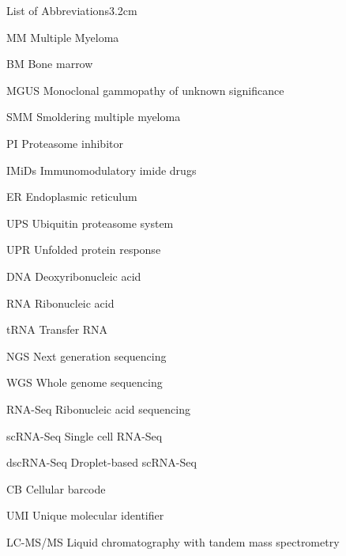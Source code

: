 \begin{mclistof}{List of Abbreviations}{3.2cm}

\item[MM] Multiple Myeloma

\item[BM] Bone marrow

\item[MGUS] Monoclonal gammopathy of unknown significance

\item[SMM] Smoldering multiple myeloma

\item[PI] Proteasome inhibitor

\item[IMiDs] Immunomodulatory imide drugs

\item[ER] Endoplasmic reticulum

\item[UPS] Ubiquitin proteasome system

\item[UPR] Unfolded protein response

\item[DNA] Deoxyribonucleic acid

\item[RNA] Ribonucleic acid

\item[tRNA] Transfer RNA

\item[NGS] Next generation sequencing

\item[WGS] Whole genome sequencing

\item[RNA-Seq] Ribonucleic acid sequencing

\item[scRNA-Seq] Single cell RNA-Seq

\item[dscRNA-Seq] Droplet-based scRNA-Seq

\item[CB] Cellular barcode

\item[UMI] Unique molecular identifier

\item[LC-MS/MS] Liquid chromatography with tandem mass spectrometry


\end{mclistof}

